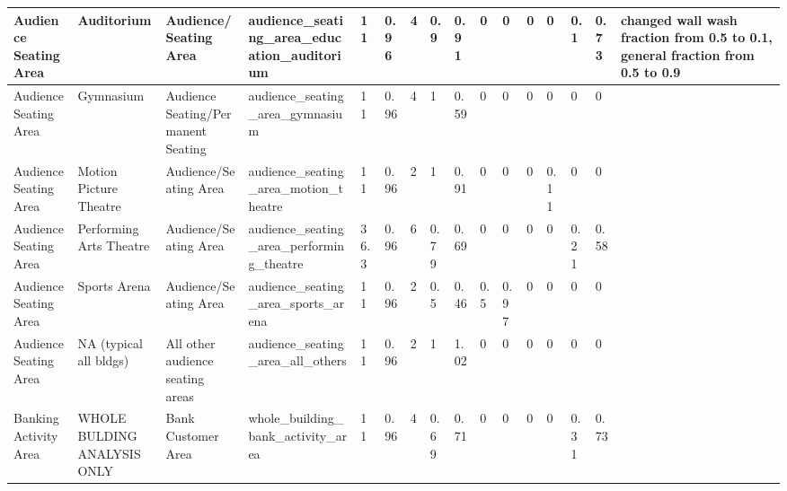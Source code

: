 \begin{center}
\begin{landscape}
\begin{longtable}{|p{0.75in}|p{0.75in}|p{0.75in}|p{0.75in}|p{0.3in}|p{0.3in}|p{0.3in}|p{0.3in}|p{0.3in}|p{0.3in}|p{0.3in}|p{0.3in}|p{0.3in}|p{0.3in}|p{0.3in}|p{0.6in}|}
      Audience Seating Area                   & Auditorium                  & Audience/Seating Area                           & audience\_seating\_area\_education\_auditorium                  & 11   & 0.96 & 4  & 0.9    & 0.91  & 0     & 0     & 0    & 0    & 0.1  & 0.73 & changed wall wash fraction from 0.5 to 0.1, general fraction from 0.5 to 0.9          \\ \hline
      Audience Seating Area                   & Gymnasium                   & Audience Seating/Permanent Seating              & audience\_seating\_area\_gymnasium                              & 11   & 0.96 & 4  & 1      & 0.59  & 0     & 0     & 0    & 0    & 0    & 0    &                                                                                       \\ \hline
      Audience Seating Area                   & Motion Picture Theatre      & Audience/Seating Area                           & audience\_seating\_area\_motion\_theatre                        & 11   & 0.96 & 2  & 1      & 0.91  & 0     & 0     & 0    & 0.11 & 0    & 0    &                                                                                       \\ \hline
      Audience Seating Area                   & Performing Arts Theatre     & Audience/Seating Area                           & audience\_seating\_area\_performing\_theatre                    & 36.3 & 0.96 & 6  & 0.79   & 0.69  & 0     & 0     & 0    & 0    & 0.21 & 0.58 &                                                                                       \\ \hline
      Audience Seating Area                   & Sports Arena                & Audience/Seating Area                           & audience\_seating\_area\_sports\_arena                          & 11   & 0.96 & 2  & 0.5    & 0.46  & 0.5   & 0.97  & 0    & 0    & 0    & 0    &                                                                                       \\ \hline
      Audience Seating Area                   & NA (typical all bldgs)      & All other audience seating areas                & audience\_seating\_area\_all\_others                            & 11   & 0.96 & 2  & 1      & 1.02  & 0     & 0     & 0    & 0    & 0    & 0    &                                                                                       \\ \hline
      Banking Activity Area                   & WHOLE BULDING ANALYSIS ONLY & Bank Customer Area                              & whole\_building\_bank\_activity\_area                           & 11   & 0.96 & 4  & 0.69   & 0.71  & 0     & 0     & 0    & 0    & 0.31 & 0.73 &                                                                                       \\ \hline

\end{longtable}
\end{landscape}
\end{center}
